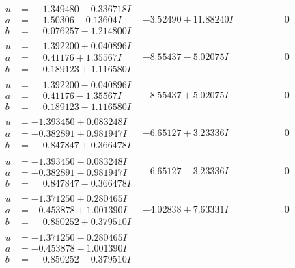 \documentclass[1p]{elsarticle_modified}
\theoremstyle{definition}
\begin{document}
$$\begin{array}{c|c|c}
\begin{aligned}
u &= \phantom{-}1.349480 - 0.336718 I \\
a &= \phantom{-}1.50306 - 0.13604 I \\
b &= \phantom{-}0.076257 - 1.214800 I\end{aligned}
 & -3.52490 + 11.88240 I & \phantom{-0.000000 } 0 \\ \hline\begin{aligned}
u &= \phantom{-}1.392200 + 0.040896 I \\
a &= \phantom{-}0.41176 + 1.35567 I \\
b &= \phantom{-}0.189123 + 1.116580 I\end{aligned}
 & -8.55437 - 5.02075 I & \phantom{-0.000000 } 0 \\ \hline\begin{aligned}
u &= \phantom{-}1.392200 - 0.040896 I \\
a &= \phantom{-}0.41176 - 1.35567 I \\
b &= \phantom{-}0.189123 - 1.116580 I\end{aligned}
 & -8.55437 + 5.02075 I & \phantom{-0.000000 } 0 \\ \hline\begin{aligned}
u &= -1.393450 + 0.083248 I \\
a &= -0.382891 + 0.981947 I \\
b &= \phantom{-}0.847847 + 0.366478 I\end{aligned}
 & -6.65127 + 3.23336 I & \phantom{-0.000000 } 0 \\ \hline\begin{aligned}
u &= -1.393450 - 0.083248 I \\
a &= -0.382891 - 0.981947 I \\
b &= \phantom{-}0.847847 - 0.366478 I\end{aligned}
 & -6.65127 - 3.23336 I & \phantom{-0.000000 } 0 \\ \hline\begin{aligned}
u &= -1.371250 + 0.280465 I \\
a &= -0.453878 + 1.001390 I \\
b &= \phantom{-}0.850252 + 0.379510 I\end{aligned}
 & -4.02838 + 7.63331 I & \phantom{-0.000000 } 0 \\ \hline\begin{aligned}
u &= -1.371250 - 0.280465 I \\
a &= -0.453878 - 1.001390 I \\
b &= \phantom{-}0.850252 - 0.379510 I\end{aligned}

\end{array}$$
\end{document}
